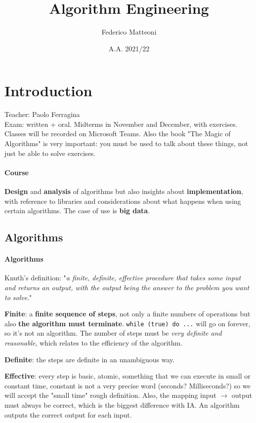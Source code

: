 \documentclass[10pt]{report}
\begin{document}
\title{Algorithm Engineering}
\author{Federico Matteoni}
\date{A.A. 2021/22}
\renewcommand*\contentsname{Index}

\maketitle
\begin{multicols}{2}
\tableofcontents
\end{multicols}
\pagebreak
\section{Introduction}
Teacher: Paolo Ferragina\\
Exam: written + oral. Midterms in November and December, with exercises.\\
Classes will be recorded on Microsoft Teams. Also the book "The Magic of Algorithms" is very important: you must be used to talk about these things, not just be able to solve exercises.
\paragraph{Course} \textbf{Design} and \textbf{analysis} of algorithms but also insights about \textbf{implementation}, with reference to libraries and considerations about what happens when using certain algorithms. The case of use is \textbf{big data}.
\subsection{Algorithms} 
\paragraph{Algorithms} Knuth's definition: "\textit{a finite, definite, effective procedure that takes some input and returns an output, with the output being the answer to the problem you want to solve}."\begin{list}{}{}
	\item \textbf{Finite}: a \textbf{finite sequence of steps}, not only a finite numbers of operations but also \textbf{the algorithm must terminate}. \texttt{while (true) do ...} will go on forever, so it's not an algorithm. The number of steps must be \textit{very definite and reasonable}, which relates to the efficiency of the algorithm.
	\item \textbf{Definite}: the steps are definite in an unambiguous way.
	\item \textbf{Effective}: every step is basic, atomic, something that we can execute in small or constant time, constant is not a very precise word (seconds? Milliseconds?) so we will accept the "small time" rough definition. Also, the mapping input $\rightarrow$ output must always be correct, which is the biggest difference with IA. An algorithm outputs the correct output for each input.
\end{list}
\end{document}

